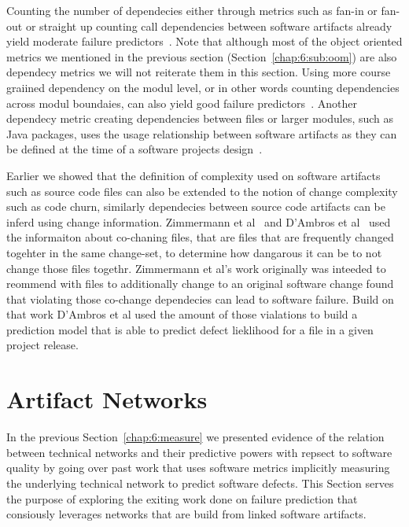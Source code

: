 Counting the number of dependecies either through metrics such as fan-in or fan-out or straight up counting call dependencies between software artifacts already yield moderate failure predictors~\cite{cataldo:icse:2011,nagappan:icse:2006,arisholm:isese:2006,knab:msr:2006,shin:msr:2006}.
Note that although most of the object oriented metrics we mentioned in the previous section (Section~\ref{chap:6:sub:oom}) are also dependecy metrics we will not reiterate them in this section. 
Using more course graiined dependency on the modul level, or in other words counting dependencies across modul boundaies, can also yield good failure predictors~\cite{jiang:promise:2008}.
Another dependecy metric creating dependencies between files or larger modules, such as Java packages, uses the usage relationship between software artifacts as they can be defined at the time of a software projects design~\cite{schoeter:isese:2006,dualaekoko:esem:2009}.

Earlier we showed that the definition of complexity used on software artifacts such as source code files can also be extended to the notion of change complexity such as code churn, similarly dependecies between source code artifacts can be inferd using change information.
Zimmermann et al~\cite{zimmermann:icse:2004} and D'Ambros et al~\cite{dambros:wcre:2009} used the informaiton about co-chaning files, that are files that are frequently changed togehter in the same change-set, to determine how dangarous it can be to not change those files togethr.
Zimmermann et al's work originally was inteeded to reommend with files to additionally change to an original software change  found that violating those co-change dependecies can lead to software failure.
Build on that work D'Ambros et al used the amount of those vialations to build a prediction model that is able to predict defect lieklihood for a file in a given project release. 


\section{Artifact Networks}
\label{chap:6:an}
In the previous Section~\ref{chap:6:measure} we presented evidence of the relation between technical networks and their predictive powers with repsect to software quality by going over past work that uses software metrics implicitly measuring the underlying technical network to predict software defects.
This Section serves the purpose of exploring the exiting work done on failure prediction that consiously leverages networks that are build from linked software artifacts.

